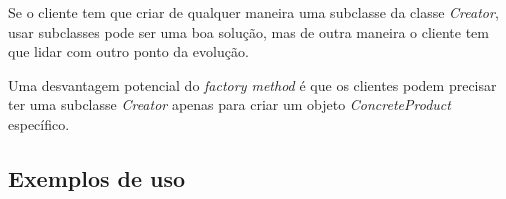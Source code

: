 Se o cliente tem que criar de qualquer maneira uma subclasse da classe \emph{Creator}, usar subclasses pode ser uma boa solução, mas de outra maneira o cliente tem que lidar com outro ponto da evolução.

Uma desvantagem potencial do \emph{factory method} é que os clientes podem precisar ter uma subclasse \emph{Creator} apenas para criar um objeto \emph{ConcreteProduct} específico.


\subsection{Exemplos de uso}
\label{sub:fac_uso}
